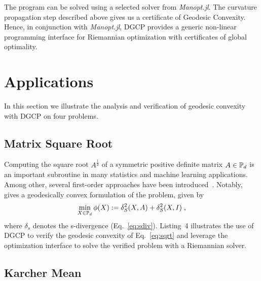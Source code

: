 \documentclass[twoside,11pt]{article}
\begin{document}
The program can be solved using a selected solver from \textsl{Manopt.jl}. The curvature propagation step described above gives us a certificate of Geodesic Convexity. Hence, in conjunction with \textsl{Manopt.jl}, DGCP provides a generic non-linear programming interface for Riemannian optimization with certificates of global optimality. %


\section{Applications}
In this section we illustrate the analysis and verification of geodesic convexity with DGCP on four problems.

\subsection{Matrix Square Root}
Computing the square root $A^{\frac{1}{2}}$ of a symmetric positive definite matrix $A \in \mathbb{P}_d$ is an important subroutine in many statistics and machine learning applications. Among other, several first-order approaches have been introduced~\citep{jain2017global,sra2015matrix}. Notably,~\cite{sra2015matrix} gives a geodesically convex formulation of the problem, given by
\begin{equation}\label{eq:sqrt}
    \min _{X \in \mathbb{P}_d} \phi(X) := \delta_S^2(X, A)+\delta_S^2(X, I) \; ,
\end{equation}
where $\delta_s$ denotes the s-divergence (Eq.~\ref{eq:sdiv}). Listing~4 %
illustrates the use of DGCP to verify the geodesic convexity of Eq.~\ref{eq:sqrt} and leverage the optimization interface to solve the verified problem with a Riemannian solver.

\subsection{Karcher Mean}\label{sec:karcher_mean}
\end{document}

